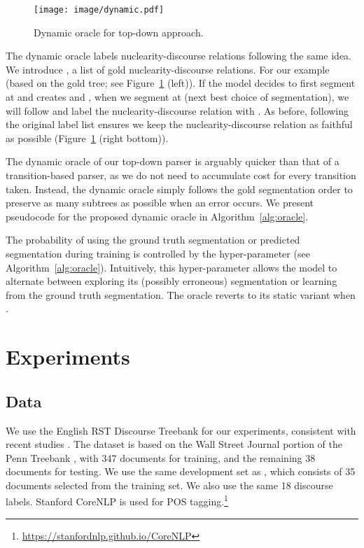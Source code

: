 \documentclass[11pt,a4paper]{article}
\newcommand{\figref}[2][]{Figure#1~\ref{fig:#2}}
\newcommand{\algoref}[2][]{Algorithm#1~\ref{alg:#2}}
\begin{document}
\begin{figure}
	\centering
	\texttt{[image: image/dynamic.pdf]}
	\caption{Dynamic oracle for top-down approach.}
	\label{fig:dynamic}
\end{figure}
The dynamic oracle labels nuclearity-discourse relations following the
same idea.  We introduce , a list of gold nuclearity-discourse
relations.  For our example  (based on the
gold tree; see \figref{dynamic} (left)).  If the model decides to first
segment at  and creates  and , when we segment at
 (next best choice of segmentation), we will follow  and label
the nuclearity-discourse relation with .  As before, following the
original label list  ensures we keep the nuclearity-discourse relation
as faithful as possible (\figref{dynamic} (right bottom)).









The dynamic oracle of our top-down parser is arguably quicker than that
of a transition-based parser, as we do not need to accumulate cost for
every transition taken.  Instead, the dynamic oracle simply follows the
gold segmentation order  to preserve as many subtrees as possible
when an error occurs. We present pseudocode for the proposed dynamic
oracle in \algoref{oracle}.

The probability of using the ground truth segmentation or predicted
segmentation during training is controlled by the hyper-parameter
 (see \algoref{oracle}). Intuitively, this hyper-parameter
allows the model to alternate between exploring its (possibly erroneous)
segmentation or learning from the ground truth segmentation. The oracle
reverts to its static variant when .

\section{Experiments}
\label{sec:experiments}

\subsection{Data}

We use the English RST Discourse Treebank \cite{carlson2001building} for our
experiments, consistent with recent studies
\cite{ji-eisenstein-2014-representation, li-etal-2014-recursive,
  feng-hirst-2014-linear, yu2018transition}. The dataset is based on the
Wall Street Journal portion of the Penn Treebank
\citep{marcus-etal-1993-building}, with 347 documents for
training, and the remaining 38 documents for testing. We use the same
development set as \citet{yu2018transition}, which consists of 35
documents selected from the training set. We also use
the same 18 discourse labels. Stanford
CoreNLP \cite{manning-etal-2014-stanford} is used for POS
tagging.\footnote{\url{https://stanfordnlp.github.io/CoreNLP}}
\end{document}
